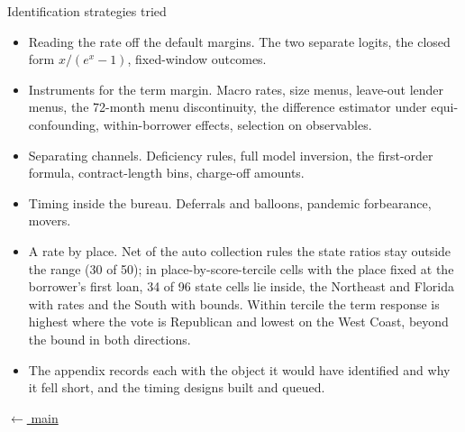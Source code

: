 \documentclass[aspectratio=169,11pt]{beamer}
\newcommand{\m}[1]{\item #1}
\newcommand{\backto}{\hfill{\scriptsize\hyperlink{main-end}{\textcolor{bureaublue}{$\leftarrow$ main}}}}
\begin{document}
\begin{frame}{Identification strategies tried}
\begin{itemize}\small
\m{Reading the rate off the default margins. The two separate logits, the closed form $x/(e^x-1)$, fixed-window outcomes.}
\m{Instruments for the term margin. Macro rates, size menus, leave-out lender menus, the 72-month menu discontinuity, the difference estimator under equi-confounding, within-borrower effects, selection on observables.}
\m{Separating channels. Deficiency rules, full model inversion, the first-order formula, contract-length bins, charge-off amounts.}
\m{Timing inside the bureau. Deferrals and balloons, pandemic forbearance, movers.}
\m{A rate by place. Net of the auto collection rules the state ratios stay outside the range (30 of 50); in place-by-score-tercile cells with the place fixed at the borrower's first loan, 34 of 96 state cells lie inside, the Northeast and Florida with rates and the South with bounds. Within tercile the term response is highest where the vote is Republican and lowest on the West Coast, beyond the bound in both directions.}
\m{The appendix records each with the object it would have identified and why it fell short, and the timing designs built and queued.}
\end{itemize}\backto
\end{frame}
\end{document}
